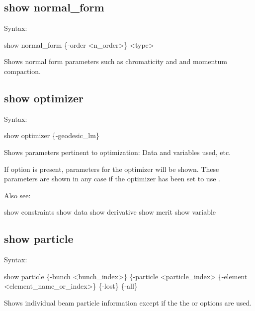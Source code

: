 {{{{{{{{%

\subsection{show normal_form}
\label{s:show.normal}

Syntax:
\begin{example}
  show normal_form \{-order <n_order>\} <type>
\end{example}

Shows normal form parameters such as chromaticity and and momentum compaction.


\subsection{show optimizer}
\label{s:show.optimizer}

Syntax:
\begin{example}
  show optimizer \{-geodesic_lm\}
\end{example}


Shows parameters pertinent to optimization: Data and variables used,
etc. 

If  option is present, parameters for the  optimizer will
be shown. These parameters are shown in any case if the optimizer has been set to use
.

Also see:
\begin{example}
  show constraints
  show data
  show derivative
  show merit
  show variable
\end{example}


\subsection{show particle}
\label{s:show.particle}

Syntax:
\begin{example}
    show particle \{-bunch <bunch_index>\} \{-particle <particle_index>
                  \{-element <element_name_or_index>\} \{-lost\} \{-all\}
\end{example}


Shows individual beam particle information except if the the  or  options are used. 

}}}}}}}}
